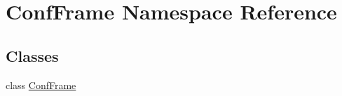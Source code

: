 \hypertarget{namespaceConfFrame}{
\section{ConfFrame Namespace Reference}
\label{namespaceConfFrame}
}
\subsection*{Classes}
\begin{DoxyCompactItemize}
\item 
class \hyperlink{classConfFrame_1_1ConfFrame}{ConfFrame}
\end{DoxyCompactItemize}
